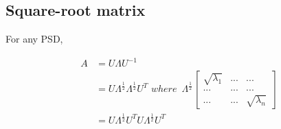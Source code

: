 \subsection{Square-root matrix}

For any PSD,

\begin{align*}
A &= U\Lambda U^{-1} \\
&=U\Lambda^{\frac{1}{2}}\Lambda^{\frac{1}{2}}U^{T}\,\, where \,\,\, \Lambda^{\frac{1}{2}}
\begin{bmatrix}%
\sqrt{\lambda_1}&...&...\\
...&...&...\\
...&...&\sqrt{\lambda_n}
\end{bmatrix}\\
&= U\Lambda^{\frac{1}{2}}U^TU\Lambda^{\frac{1}{2}}U^T
\end{align*}
